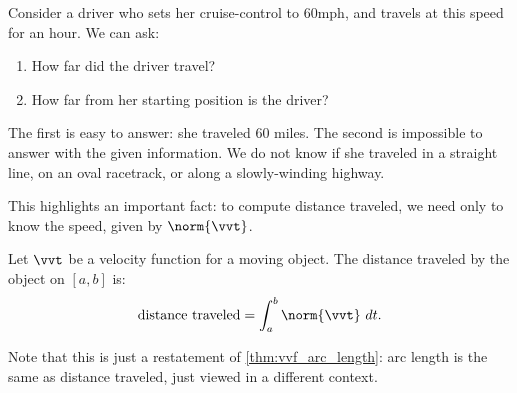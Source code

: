 Consider a driver who sets her cruise-control to 60mph, and travels at this speed for an hour. We can ask:
\begin{enumerate}
	\item How far did the driver travel?
	\item	How far from her starting position is the driver?
\end{enumerate} 
The first is easy to answer: she traveled 60 miles. The second is impossible to answer with the given information. We do not know if she traveled in a straight line, on an oval racetrack, or along a slowly-winding highway.

This highlights an important fact: to compute distance traveled, we need only to know the speed, given by $\norm{\vvt}$.

{Let $\vvt$ be a velocity function for a moving object. The distance traveled by the object on $[a,b]$ is:
\[\text{distance traveled} = \int_a^b \norm{\vvt}\ dt.\]}

Note that this is just a restatement of \autoref{thm:vvf_arc_length}: arc length is the same as distance traveled, just viewed in a different context.



